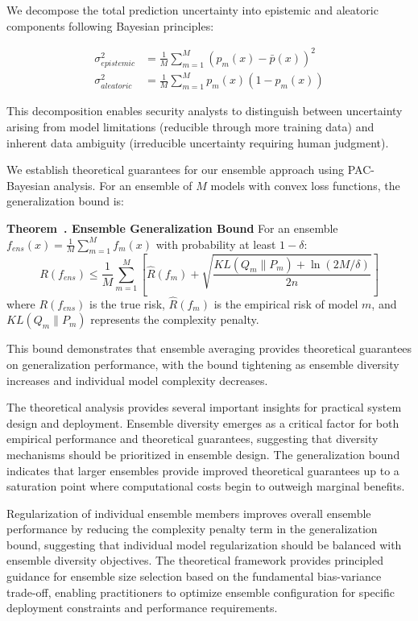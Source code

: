 \documentclass[journal]{IEEEtran}
\newcounter{theorem}
\newenvironment{theorem}[1][]{\refstepcounter{theorem}\par\medskip
   \noindent \textbf{Theorem~\thetheorem. #1} \rmfamily}{\medskip}
\begin{document}
We decompose the total prediction uncertainty into epistemic and aleatoric components following Bayesian principles:

\begin{align}
\sigma_{epistemic}^2 &= \frac{1}{M} \sum_{m=1}^M (p_m(x) - \bar{p}(x))^2 \\
\sigma_{aleatoric}^2 &= \frac{1}{M} \sum_{m=1}^M p_m(x)(1-p_m(x))
\end{align}

This decomposition enables security analysts to distinguish between uncertainty arising from model limitations (reducible through more training data) and inherent data ambiguity (irreducible uncertainty requiring human judgment).

We establish theoretical guarantees for our ensemble approach using PAC-Bayesian analysis. For an ensemble of $M$ models with convex loss functions, the generalization bound is:

\begin{theorem}[Ensemble Generalization Bound]
For an ensemble $f_{ens}(x) = \frac{1}{M} \sum_{m=1}^M f_m(x)$ with probability at least $1-\delta$:
\begin{equation}
R(f_{ens}) \leq \frac{1}{M} \sum_{m=1}^M \left[ \hat{R}(f_m) + \sqrt{\frac{KL(Q_m \| P_m) + \ln(2M/\delta)}{2n}} \right]
\end{equation}
where $R(f_{ens})$ is the true risk, $\hat{R}(f_m)$ is the empirical risk of model $m$, and $KL(Q_m \| P_m)$ represents the complexity penalty.
\end{theorem}

This bound demonstrates that ensemble averaging provides theoretical guarantees on generalization performance, with the bound tightening as ensemble diversity increases and individual model complexity decreases.

The theoretical analysis provides several important insights for practical system design and deployment. Ensemble diversity emerges as a critical factor for both empirical performance and theoretical guarantees, suggesting that diversity mechanisms should be prioritized in ensemble design. The generalization bound indicates that larger ensembles provide improved theoretical guarantees up to a saturation point where computational costs begin to outweigh marginal benefits.

Regularization of individual ensemble members improves overall ensemble performance by reducing the complexity penalty term in the generalization bound, suggesting that individual model regularization should be balanced with ensemble diversity objectives. The theoretical framework provides principled guidance for ensemble size selection based on the fundamental bias-variance trade-off, enabling practitioners to optimize ensemble configuration for specific deployment constraints and performance requirements.
\end{document}
